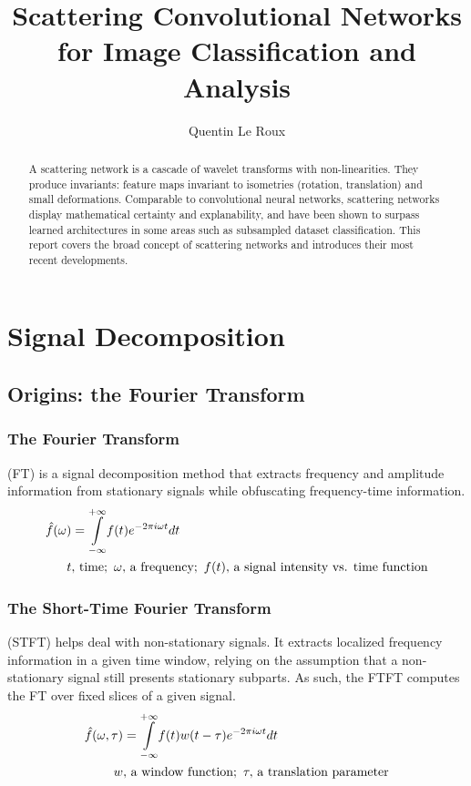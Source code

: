 \documentclass[runningheads]{llncs}
\begin{document}
%
\title{Scattering Convolutional Networks for Image Classification and Analysis}
%
%
\author{Quentin Le Roux}
%
%
%
\maketitle              %
%
\begin{abstract}
A scattering network is a cascade of wavelet transforms with non-linearities. They produce invariants: feature maps invariant to isometries (rotation, translation) and small deformations. Comparable to convolutional neural networks, scattering networks display mathematical certainty and explanability, and have been shown to surpass learned architectures in some areas such as subsampled dataset classification. This report covers the broad concept of scattering networks and introduces their most recent developments.
%
\end{abstract}
%
\section{Signal Decomposition}

\subsection{Origins: the Fourier Transform}

\subsubsection{The Fourier Transform} (FT) is a signal decomposition method that extracts frequency and amplitude information from stationary signals while obfuscating frequency-time information.
\begin{align}
    \hat{f}(\omega)&=\underset{-\infty}{\overset{+\infty}{\int}}f(t)e^{-2\pi i \omega t}dt\\
    t&,\,\text{time};\,\,\omega,\,\text{a frequency};\,\,f(t),\,\text{a signal intensity vs. time function}\notag
\end{align}

\subsubsection{The Short-Time Fourier Transform} (STFT) helps deal with non-stationary signals\cite{andrew_nicoll}. It extracts localized frequency information in a given time window, relying on the assumption that a non-stationary signal still presents stationary subparts. As such, the FTFT computes the FT over fixed slices of a given signal.
\begin{align}
    \hat{f}(\omega, \tau)&=\underset{-\infty}{\overset{+\infty}{\int}}f(t)w(t-\tau)e^{-2\pi i \omega t}dt\\
    w&,\,\text{a window function};\,\,\tau,\,\text{a translation parameter}\notag
\end{align}
\end{document}
